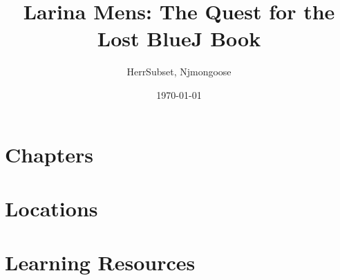 \documentclass[11pt,a4paper]{article}
\title{Larina Mens: The Quest for the Lost BlueJ Book}
\date{\today}
\author{HerrSubset, Njmongoose}
\begin{document}
\maketitle
\newpage
\tableofcontents
\newpage

\part{Chapters}



\newpage
\part{Locations}



\newpage
\part{Learning Resources}

\end{document}
